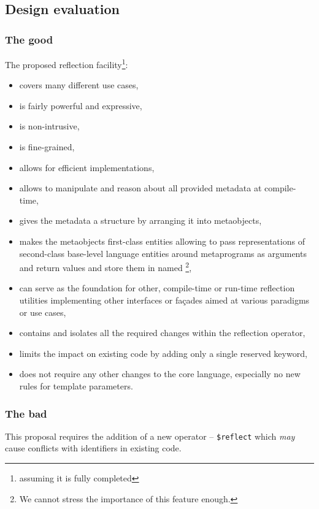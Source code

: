 \subsection{Design evaluation}

\subsubsection{The good}

The proposed reflection facility\footnote{assuming it is fully completed}:

\begin{itemize}
\item covers many different use cases,
\item is fairly powerful and expressive,
\item is non-intrusive,
\item is fine-grained,
\item allows for efficient implementations,
\item allows to manipulate and reason about all provided metadata at compile-time,
\item gives the metadata a structure by arranging it into metaobjects,
\item makes the metaobjects first-class entities allowing to pass
	representations of second-class base-level language entities
	around metaprograms as arguments and return values and store them
	in named \footnote{We cannot stress the importance of this
	feature enough.},
\item can serve as the foundation for other, compile-time or run-time reflection
	utilities implementing other interfaces or fa\c{c}ades aimed at various
	paradigms or use cases,
\item contains and isolates all the required changes within the reflection operator,
\item limits the impact on existing code by adding only a single reserved keyword,
\item does not require any other changes to the core language, especially no new rules
	for template parameters.
\end{itemize}

\subsubsection{The bad}

This proposal requires the addition of a new operator -- \texttt{\$reflect}
which {\em may} cause conflicts with identifiers in existing code.

